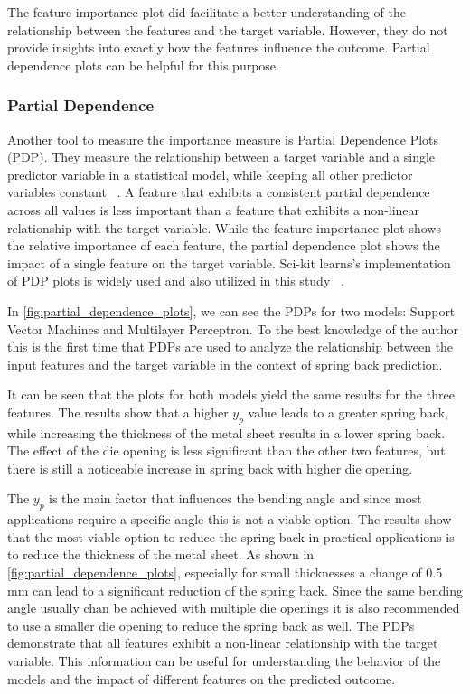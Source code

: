 The feature importance plot did facilitate a better understanding of the relationship between the features and the
target
variable.
However, they do not provide insights into exactly how the features influence the outcome.
Partial dependence plots can be helpful for this purpose.

\subsubsection{Partial Dependence}

Another tool to measure the importance measure is Partial Dependence Plots (PDP).
They measure the relationship between a target variable and a single predictor variable in a statistical model, while
keeping all other predictor variables constant
~\cite[pp. 313--314]{boehmke2019hands}.
A feature that exhibits a consistent partial dependence across all values is less important than a feature that
exhibits a non-linear relationship with the target variable.
While the feature importance plot shows the relative importance of each feature, the partial dependence plot shows
the impact of a single feature on the target variable.
Sci-kit learns's implementation of PDP plots is widely used and also utilized in this study
~\cite{scikit-learn}.


In \cref{fig:partial_dependence_plots}, we can see the PDPs for two models: Support Vector Machines and
Multilayer Perceptron.
To the best knowledge of the author this is the first time that PDPs are used to analyze the relationship between
the input features and the target variable in the context of spring back prediction.

It can be seen that the plots for both models yield the same results for the three features.
The results show that a higher $y_p$ value leads to a greater spring back, while
increasing the thickness of the metal sheet results in a lower spring back.
The effect of the die opening is less significant than the other two features, but there is still a noticeable
increase in spring back with higher die opening.

The $y_p$ is the main factor that influences the bending angle and since most applications require a specific angle
this is not a viable option.
The results show that the most viable option to reduce the spring back in practical applications is to reduce the
thickness of the metal sheet.
As shown in \cref{fig:partial_dependence_plots}, especially for small thicknesses a change of 0.5 mm can lead to a
significant reduction of the spring back.
Since the same bending angle usually chan be achieved with multiple die openings it is also recommended to use a
smaller die opening to reduce the spring back as well.
The PDPs demonstrate that all features exhibit a non-linear relationship with the target variable.
This information can be useful for understanding the behavior of the models and the impact of different features on
the predicted outcome.

